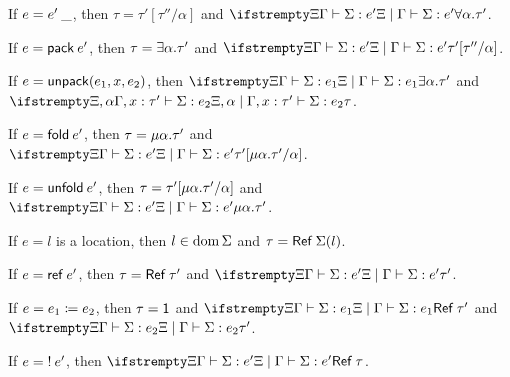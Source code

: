 \begin{lemma}
\begin{enumlemma}[left=0.5cm]
        \item\label{enum:inversion-tapp} If $e = \textcolor{black}{e'}\:\_$, then $\tau = \tau'[\tau''/\alpha]$ and $\typerel{\Xi}{\Gamma}{\Sigma}{e'}{\typeForall{\alpha}{\tau'}}$.

        \item\label{enum:inversion-pack} If $e = \expPack{e'}$, then $\tau = \typeExists{\alpha}{\tau'}$ and $\typerel{\Xi}{\Gamma}{\Sigma}{e'}{\tau'[\tau''/\alpha]}$.

        \item\label{enum:inversion-unpack} If $e = \mathsf{unpack}(e_1,x,e_2)$, then $\typerel{\Xi}{\Gamma}{\Sigma}{e_1}{\typeExists{\alpha}{\tau'}}$ and $\typerel{\Xi,\alpha}{\Gamma, \hastype{x}{\tau'}}{\Sigma}{e_2}{\tau}$.

        \item\label{enum:inversion-fold} If $e = \expFold{e'}$, then $\tau = \typeRec{\alpha}{\tau'}$ and $\typerel{\Xi}{\Gamma}{\Sigma}{e'}{\tau'[\typeRec{\alpha}{\tau'}/\alpha]}$.

        \item\label{enum:inversion-unfold} If $e = \mathsf{unfold}\: e'$, then $\tau = \tau'[\typeRec{\alpha}{\tau'}/\alpha]$ and $\typerel{\Xi}{\Gamma}{\Sigma}{e'}{\typeRec{\alpha}{\tau'}}$.

        \item\label{enum:inversion-location} If $e = l$ is a location, then $l \in \operatorname{dom}\Sigma$ and $\tau = \mathsf{Ref}\:\Sigma(l)$.

        \item\label{enum:inversion-ref} If $e = \mathsf{ref}\: e'$, then $\tau = \mathsf{Ref}\:\tau'$ and $\typerel{\Xi}{\Gamma}{\Sigma}{e'}{\tau'}$.

        \item\label{enum:inversion-ass} If $e = \textcolor{black}{e_1} \coloneqq \textcolor{black}{e_2}$, then $\tau = \mathsf{1}$ and $\typerel{\Xi}{\Gamma}{\Sigma}{e_1}{\typeRef{\tau'}}$ and $\typerel{\Xi}{\Gamma}{\Sigma}{e_2}{\tau'}$.

        \item\label{enum:inversion-load} If $e = \mathsf{!}\: e'$, then $\typerel{\Xi}{\Gamma}{\Sigma}{e'}{\typeRef{\tau}}$.
    \end{enumlemma}
\end{lemma}

